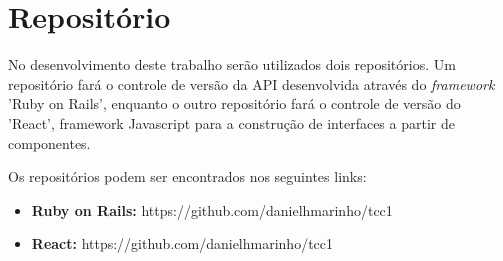 \section{Repositório}

No desenvolvimento deste trabalho serão utilizados dois repositórios. Um repositório fará o controle de versão da API desenvolvida através do \textit{framework} 'Ruby on Rails', enquanto o outro repositório fará o controle de versão do 'React', framework Javascript  para a construção de interfaces a partir de componentes.

Os repositórios podem ser encontrados nos seguintes links:

\begin{itemize}

  \item \textbf{Ruby on Rails:} https://github.com/danielhmarinho/tcc1

  \item \textbf{React:} https://github.com/danielhmarinho/tcc1

\end{itemize}
